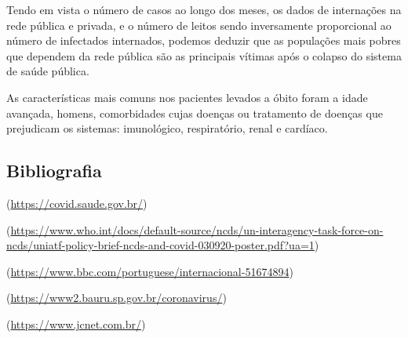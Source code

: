 \documentclass[
]{article}
\begin{document}
Tendo em vista o número de casos ao longo dos meses, os dados de
internações na rede pública e privada, e o número de leitos sendo
inversamente proporcional ao número de infectados internados, podemos
deduzir que as populações mais pobres que dependem da rede pública são
as principais vítimas após o colapso do sistema de saúde pública.

As características mais comuns nos pacientes levados a óbito foram a
idade avançada, homens, comorbidades cujas doenças ou tratamento de
doenças que prejudicam os sistemas: imunológico, respiratório, renal e
cardíaco.

\hypertarget{bibliografia}{%
\subsection{Bibliografia}\label{bibliografia}}

(\url{https://covid.saude.gov.br/})

(\url{https://www.who.int/docs/default-source/ncds/un-interagency-task-force-on-ncds/uniatf-policy-brief-ncds-and-covid-030920-poster.pdf?ua=1})

(\url{https://www.bbc.com/portuguese/internacional-51674894})

(\url{https://www2.bauru.sp.gov.br/coronavirus/})

(\url{https://www.jcnet.com.br/})
\end{document}
